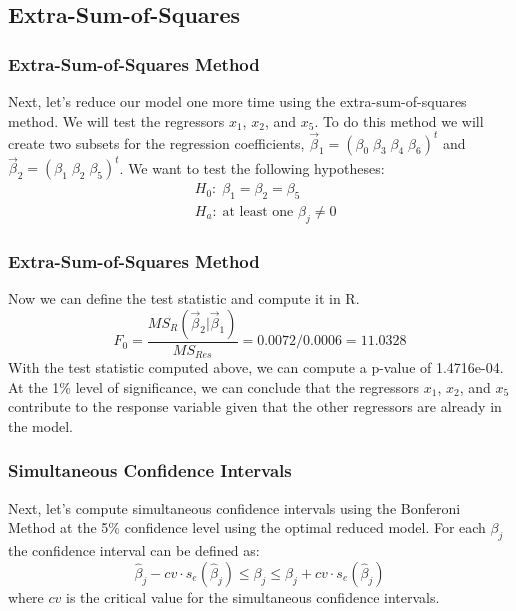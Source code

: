 \documentclass[12pt]{beamer}
\begin{document}
\subsection{Extra-Sum-of-Squares}
\begin{frame}
\frametitle{Extra-Sum-of-Squares Method}
Next, let's reduce our model one more time using the extra-sum-of-squares method. We will test the regressors $x_1$, $x_2$, and $x_5$. To do this method we will create two subsets for the regression coefficients, $\vec{\beta}_1=\left(\beta_0\;\beta_3\;\beta_4\;\beta_6\right)^t$ and $\vec{\beta}_2=\left(\beta_1\;\beta_2\;\beta_5\right)^t$. We want to test the following hypotheses:
\begin{align*}
	&H_0:\;\beta_1=\beta_2=\beta_5\\
	&H_a:\;\text{at least one $\beta_j\neq 0$}
\end{align*}
\end{frame}

\begin{frame}
\frametitle{Extra-Sum-of-Squares Method}
Now we can define the test statistic and compute it in R. $$F_0=\frac{MS_R\left(\vec{\beta}_2|\vec{\beta}_1\right)}{MS_{Res}}=0.0072/0.0006=11.0328$$ With the test statistic computed above, we can compute a p-value of 1.4716e-04. At the 1\% level of significance, we can conclude that the regressors $x_1$, $x_2$, and $x_5$ contribute to the response variable given that the other regressors are already in the model.
\end{frame}

\begin{frame}
\frametitle{Simultaneous Confidence Intervals}
Next, let's compute simultaneous confidence intervals using the Bonferoni Method at the 5\% confidence level using the optimal reduced model. For each $\beta_j$ the confidence interval can be defined as: $$\hat{\beta}_j-cv\cdot s_e\left(\hat{\beta}_j\right)\leq \beta_j\leq\hat{\beta}_j+cv\cdot s_e\left(\hat{\beta}_j\right)$$ where $cv$ is the critical value for the simultaneous confidence intervals.
\end{frame}
\end{document}
